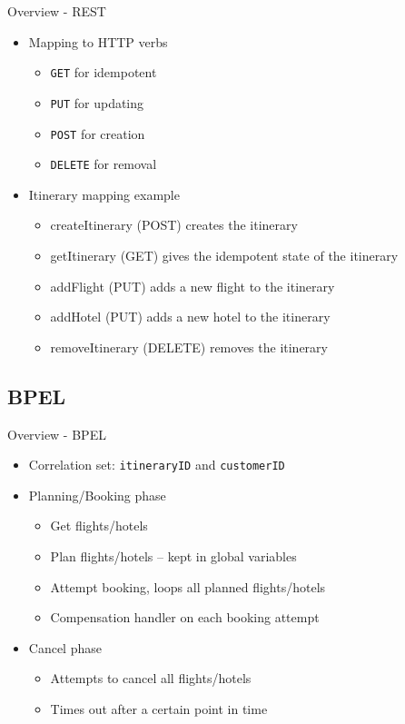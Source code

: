 \begin{frame}{Overview - REST}
\begin{itemize}[<+->]
	
	\item Mapping to HTTP verbs
	\begin{itemize}	[<2->]
		\item \texttt{GET} for idempotent
		\item \texttt{PUT} for updating
		\item \texttt{POST} for creation
		\item \texttt{DELETE} for removal
	\end{itemize}
		
	\medskip\item <3-> Itinerary mapping example
	\begin{itemize}[<4->]
		\item createItinerary (POST) creates the itinerary
		\item getItinerary (GET) gives the idempotent state of the itinerary
		\item addFlight (PUT) adds a new flight to the itinerary
		\item addHotel (PUT) adds a new hotel to the itinerary
		\item removeItinerary (DELETE) removes the itinerary
	\end{itemize}

\end{itemize}
\end{frame}

\subsection{BPEL}
\begin{frame}{Overview - BPEL}
\begin{itemize}[<+->]
	\item Correlation set: \texttt{itineraryID} and \texttt{customerID}

	\medskip\item Planning/Booking phase
	\begin{itemize}
		\item Get flights/hotels
		\item<3-> Plan flights/hotels -- kept in global variables
		\item Attempt booking, loops all planned flights/hotels
		\item Compensation handler on each booking attempt
	\end{itemize}

	\medskip\item Cancel phase
	\begin{itemize}
		\item Attempts to cancel all flights/hotels
		\item<7-> Times out after a certain point in time
	\end{itemize}
\end{itemize}
\end{frame}

